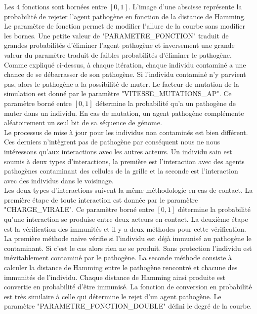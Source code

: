 Les $4$ fonctions sont bornées entre $[0,1]$. L'image d'une abscisse représente la probabilité de rejeter l'agent pathogène en fonction de la distance de Hamming. Le paramètre de fonction permet de modifier l'allure de la courbe sans modifier les bornes. Une petite valeur de {\small "PARAMETRE\_FONCTION"} traduit de grandes probabilités d'éliminer l'agent pathogène et inversement une grande valeur du paramètre traduit de faibles probabilités d'éliminer le pathogène.\\

Comme expliqué ci-dessus, à chaque itération, chaque individu contaminé a une chance de se débarrasser de son pathogène. Si l'individu contaminé n'y parvient pas, alors le pathogène a la possibilité de muter. Le facteur de mutation de la simulation est donné par le paramètre {\small "VITESSE\_MUTATIONS\_AP"}. Ce paramètre borné entre $[0,1]$ détermine la probabilité qu'a un pathogène de muter dans un individu. En cas de mutation, un agent pathogène complémente aléatoirement un seul bit de sa séquence de génome.\\

Le processus de mise à jour pour les individus non contaminés est bien différent. Ces derniers n'intègrent pas de pathogène par conséquent nous ne nous intéressons qu'aux interactions avec les autres acteurs. Un individu sain est soumis à deux types d'interactions, la première est l'interaction avec des agents pathogènes contaminant des cellules de la grille et la seconde est l’interaction avec des individus dans le voisinage.\\

Les deux types d'interactions suivent la même méthodologie en cas de contact. La première étape de toute interaction est donnée par le paramètre {\small "CHARGE\_VIRALE"}. Ce paramètre borné entre $[0,1]$ détermine la probabilité qu'une interaction se produise entre deux acteurs en contact. La deuxième étape est la vérification des immunités et il y a deux méthodes pour cette vérification. La première méthode naïve vérifie si l'individu est déjà immunisé au pathogène le contaminant. Si c'est le cas alors rien ne se produit. Sans protection l'individu est inévitablement contaminé par le pathogène. La seconde méthode consiste à calculer la distance de Hamming entre le pathogène rencontré et chacune des immunités de l'individu. Chaque distance de Hamming ainsi produite est convertie en probabilité d'être immunisé. La fonction de conversion en probabilité est très similaire à celle qui détermine le rejet d'un agent pathogène. Le paramètre {\small "PARAMETRE\_FONCTION\_DOUBLE"} défini le degré de la courbe.  \\

